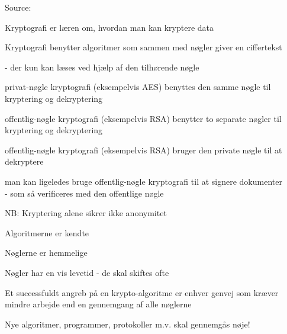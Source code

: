 \documentclass[Screen16to9,17pt]{foils}
\begin{document}
Source: 





\begin{list1}
\item Kryptografi er læren om, hvordan man kan kryptere data
\item Kryptografi benytter algoritmer som sammen med nøgler giver en
  ciffertekst
\item  - der kun kan læses ved hjælp af den tilhørende nøgle
\end{list1}



\begin{list1}
\item privat-nøgle kryptografi (eksempelvis AES) benyttes den samme
  nøgle til kryptering og dekryptering
\item offentlig-nøgle kryptografi (eksempelvis RSA) benytter to
  separate nøgler til kryptering og dekryptering
\end{list1}



\begin{list1}
\item offentlig-nøgle kryptografi (eksempelvis RSA) bruger den private
  nøgle til at dekryptere
\item man kan ligeledes bruge offentlig-nøgle kryptografi til at
  signere dokumenter\\ - som så verificeres med den offentlige nøgle
\item NB: Kryptering alene sikrer ikke anonymitet
\end{list1}



\begin{list1}
\item Algoritmerne er kendte
\item Nøglerne er hemmelige
\item Nøgler har en vis levetid - de skal skiftes ofte
\item Et successfuldt angreb på en krypto-algoritme er enhver genvej
  som kræver mindre arbejde end en gennemgang af alle nøglerne
\item Nye algoritmer, programmer, protokoller m.v. skal gennemgås nøje!
\end{list1}
\end{document}
